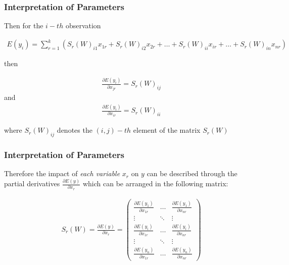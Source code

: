\documentclass[
  shownotes,
  xcolor={svgnames},
  hyperref={colorlinks,citecolor=DarkBlue,linkcolor=DarkRed,urlcolor=DarkBlue}
  ]{beamer}
\begin{document}
\begin{frame}
\frametitle{Interpretation of Parameters}
Then for the $i-th$ observation

\begin{align}
E(y_i)=\sum_{r=1}^k (S_r(W)_{i1} x_{1r} + S_r(W)_{i2}x_{2r} + \dots + S_r(W)_{ii}x_{ir} + \dots + S_r(W)_{in}x_{nr}) \nonumber
\end{align}

then

\begin{align}
\frac{\partial E(y_i)}{\partial x_{jr}}=S_r(W)_{ij}
\end{align}
and
\begin{align}
\frac{\partial E(y_i)}{\partial x_{ir}}=S_r(W)_{ii}
\end{align}

where $S_r(W)_{ij}$ denotes the $(i,j)-th$ element of the matrix $S_r(W)$
\end{frame}
\begin{frame}
\frametitle{Interpretation of Parameters}
Therefore the impact of {\it each variable}  $x_r$ on $y$ can be described through the partial derivatives $\frac{\partial E(y)}{\partial x_r}$ which can be arranged in the following matrix:

\bigskip

\begin{align}
S_r(W)=\frac{\partial E(y)}{\partial x_r}=\left(\begin{array}{ccc}
\frac{\partial E(y_{1})}{\partial x_{1r}} & \dots & \frac{\partial E(y_{1})}{\partial x_{nr}}\\
\vdots & \ddots & \vdots\\
\frac{\partial E(y_{i})}{\partial x_{1r}} & \dots & \frac{\partial E(y_{i})}{\partial x_{nr}}\\ 
\vdots & \ddots & \vdots\\
\frac{\partial E(y_{n})}{\partial x_{1r}} & \dots & \frac{\partial E(y_{n})}{\partial x_{nr}}
\end{array}\right)
\end{align}




\end{frame}
\end{document}
